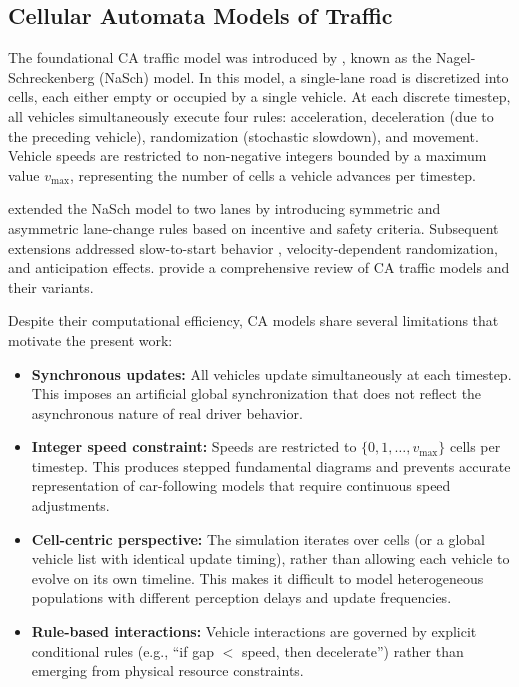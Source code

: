 \documentclass[review,number]{elsarticle}
\begin{document}
\subsection{Cellular Automata Models of Traffic}
\label{sec:lit_ca}

The foundational CA traffic model was introduced by \citet{nagel1992cellular}, known as the Nagel-Schreckenberg (NaSch) model. In this model, a single-lane road is discretized into cells, each either empty or occupied by a single vehicle. At each discrete timestep, all vehicles simultaneously execute four rules: acceleration, deceleration (due to the preceding vehicle), randomization (stochastic slowdown), and movement. Vehicle speeds are restricted to non-negative integers bounded by a maximum value $v_{\max}$, representing the number of cells a vehicle advances per timestep.

\citet{rickert1996two} extended the NaSch model to two lanes by introducing symmetric and asymmetric lane-change rules based on incentive and safety criteria. Subsequent extensions addressed slow-to-start behavior \citep{knospe2000towards}, velocity-dependent randomization, and anticipation effects. \citet{maerivoet2005cellular} provide a comprehensive review of CA traffic models and their variants.

Despite their computational efficiency, CA models share several limitations that motivate the present work:

\begin{itemize}
    \item \textbf{Synchronous updates:} All vehicles update simultaneously at each timestep. This imposes an artificial global synchronization that does not reflect the asynchronous nature of real driver behavior.

    \item \textbf{Integer speed constraint:} Speeds are restricted to $\{0, 1, \ldots, v_{\max}\}$ cells per timestep. This produces stepped fundamental diagrams and prevents accurate representation of car-following models that require continuous speed adjustments.

    \item \textbf{Cell-centric perspective:} The simulation iterates over cells (or a global vehicle list with identical update timing), rather than allowing each vehicle to evolve on its own timeline. This makes it difficult to model heterogeneous populations with different perception delays and update frequencies.

    \item \textbf{Rule-based interactions:} Vehicle interactions are governed by explicit conditional rules (e.g., ``if gap $<$ speed, then decelerate'') rather than emerging from physical resource constraints.
\end{itemize}
\end{document}
